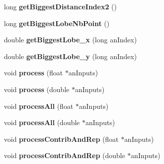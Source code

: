 \begin{DoxyCompactItemize}
\item 
\hypertarget{class_ambisonic_viewer_a7bd14370c29fef05e56e4606314ae8bf}{long {\bfseries get\-Biggest\-Distance\-Index2} ()}\label{class_ambisonic_viewer_a7bd14370c29fef05e56e4606314ae8bf}

\item 
\hypertarget{class_ambisonic_viewer_a77e09bf286ba9f80fc5bc88b1da59899}{long {\bfseries get\-Biggest\-Lobe\-Nb\-Point} ()}\label{class_ambisonic_viewer_a77e09bf286ba9f80fc5bc88b1da59899}

\item 
\hypertarget{class_ambisonic_viewer_a4cbe674d76a7d2b579a0d79785413ca1}{double {\bfseries get\-Biggest\-Lobe\-\_\-x} (long an\-Index)}\label{class_ambisonic_viewer_a4cbe674d76a7d2b579a0d79785413ca1}

\item 
\hypertarget{class_ambisonic_viewer_a97ba4f11222b1032c53c425da922a66f}{double {\bfseries get\-Biggest\-Lobe\-\_\-y} (long an\-Index)}\label{class_ambisonic_viewer_a97ba4f11222b1032c53c425da922a66f}

\item 
\hypertarget{class_ambisonic_viewer_a7455c9b906f7996e045b7ad110aacf99}{void {\bfseries process} (float $\ast$an\-Inputs)}\label{class_ambisonic_viewer_a7455c9b906f7996e045b7ad110aacf99}

\item 
\hypertarget{class_ambisonic_viewer_a0fcd69dd215368b6ad3014dba6558858}{void {\bfseries process} (double $\ast$an\-Inputs)}\label{class_ambisonic_viewer_a0fcd69dd215368b6ad3014dba6558858}

\item 
\hypertarget{class_ambisonic_viewer_a3725b496f72c8d44e189faebb111f113}{void {\bfseries process\-All} (float $\ast$an\-Inputs)}\label{class_ambisonic_viewer_a3725b496f72c8d44e189faebb111f113}

\item 
\hypertarget{class_ambisonic_viewer_af8a301e6c3dc6bd5104cdd825a6c9105}{void {\bfseries process\-All} (double $\ast$an\-Inputs)}\label{class_ambisonic_viewer_af8a301e6c3dc6bd5104cdd825a6c9105}

\item 
\hypertarget{class_ambisonic_viewer_a07127cecee1455c7255b4285361fce0d}{void {\bfseries process\-Contrib\-And\-Rep} (float $\ast$an\-Inputs)}\label{class_ambisonic_viewer_a07127cecee1455c7255b4285361fce0d}

\item 
\hypertarget{class_ambisonic_viewer_a5e66580f5e482f21b04677acebcd1ce0}{void {\bfseries process\-Contrib\-And\-Rep} (double $\ast$an\-Inputs)}\label{class_ambisonic_viewer_a5e66580f5e482f21b04677acebcd1ce0}


\end{DoxyCompactItemize}
